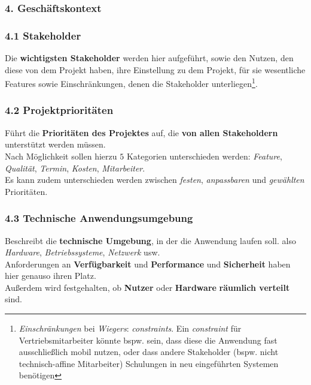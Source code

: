 \subsubsection*{4. Geschäftskontext}

\subsubsection*{4.1 Stakeholder}
Die \textbf{wichtigsten Stakeholder} werden hier aufgeführt, sowie den Nutzen, den diese von dem Projekt haben, ihre Einstellung zu dem Projekt, für sie wesentliche Features sowie Einschränkungen, denen die Stakeholder unterliegen\footnote{
\textit{Einschränkungen} bei \textit{Wiegers}: \textit{constraints}. Ein \textit{constraint} für Vertriebsmitarbeiter könnte bspw. sein, dass diese die Anwendung fast ausschließlich mobil nutzen, oder dass andere Stakeholder (bspw. nicht technisch-affine Mitarbeiter) Schulungen in neu eingeführten Systemen benötigen
}.

\subsubsection*{4.2 Projektprioritäten}
Führt die \textbf{Prioritäten des Projektes} auf, die \textbf{von allen Stakeholdern} unterstützt werden müssen.\\
Nach Möglichkeit sollen hierzu $5$ Kategorien unterschieden werden: \textit{Feature}, \textit{Qualität}, \textit{Termin},
\textit{Kosten}, \textit{Mitarbeiter}. \\
Es kann zudem unterschieden werden zwischen \textit{festen}, \textit{anpassbaren} und \textit{gewählten} Prioritäten.\\

\subsubsection*{4.3 Technische Anwendungsumgebung}
Beschreibt die \textbf{technische Umgebung}, in der die Anwendung laufen soll. also \textit{Hardware}, \textit{Betriebssysteme}, \textit{Netzwerk} usw.\\
Anforderungen an \textbf{Verfügbarkeit} und \textbf{Performance} und \textbf{Sicherheit} haben hier genauso ihren Platz.\\
Außerdem wird festgehalten, ob \textbf{Nutzer} oder \textbf{Hardware} \textbf{räumlich verteilt} sind.